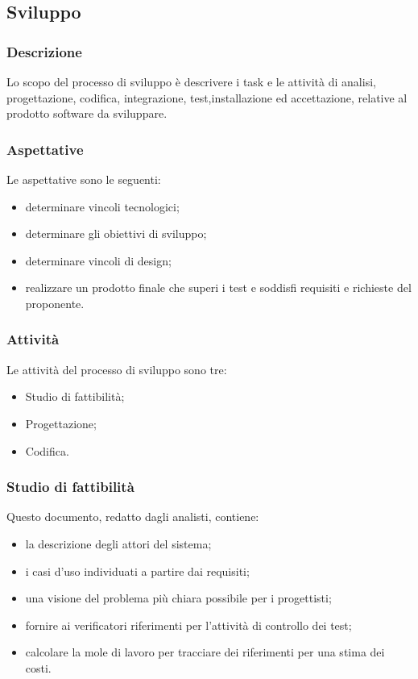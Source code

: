 \subsection{Sviluppo}
\subsubsection{Descrizione}
Lo scopo del processo di sviluppo è descrivere i task e le attività di analisi, progettazione, codifica, integrazione, test,installazione ed accettazione, relative al prodotto software da sviluppare.
\subsubsection{Aspettative}
Le aspettative sono le seguenti:
\begin{itemize}
\item determinare vincoli tecnologici;
\item determinare gli obiettivi di sviluppo;
\item determinare vincoli di design;
\item realizzare un prodotto finale che superi i test e soddisfi requisiti e richieste del proponente.
\end{itemize}
\subsubsection{Attività}
Le attività del processo di sviluppo sono tre:
\begin{itemize}
\item Studio di fattibilità;
\item Progettazione;
\item Codifica.
\end{itemize}
\subsubsection{Studio di fattibilità}
Questo documento, redatto dagli analisti, contiene:
\begin{itemize}
\item la descrizione degli attori del sistema;
\item i casi d'uso individuati a partire dai requisiti;
\item una visione del problema più chiara possibile per i progettisti;
\item fornire ai verificatori riferimenti per l'attività di controllo dei test;
\item calcolare la mole di lavoro per tracciare dei riferimenti per una stima dei costi.
\end{itemize}
